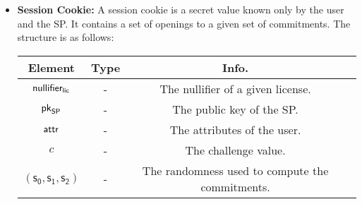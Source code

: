 \begin{itemize}
    \item \textbf{Session Cookie:} A session cookie is a secret value known only by the user and the SP. It contains a set of openings to a given set of commitments. The structure is as follows:

    \begin{center}
        \begin{tabular}{ |c|c|c|c| } 
        \hline
        \textbf{Element} & \textbf{Type} & \textbf{Info.} \\
        \hline
        $\mathsf{nullifier_{lic}}$ & - & The nullifier of a given license. \\ 
        $\mathsf{pk}_{\mathsf{SP}}$ & - & The public key of the SP. \\ 
        $\mathsf{attr}$ & - & The attributes of the user. \\ 
        $c$ & - & The challenge value. \\ 
        $(\mathsf{s_0}, \mathsf{s_1}, \mathsf{s_2})$ & - & The randomness used to compute the commitments. \\
        \hline
        \end{tabular}
    \end{center}

\end{itemize}